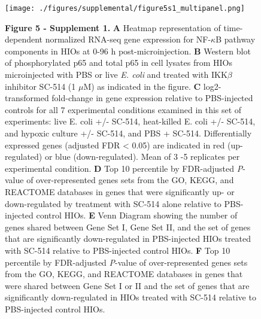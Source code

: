 \documentclass[9pt,lineo]{elife}
\date{\today}
\title{}
\begin{document}
\begin{figure}
\begin{fullwidth}
\centering\texttt{[image: ./figures/supplemental/figure5s1\_multipanel.png]}
 \caption*{\textbf{Figure 5 - Supplement 1. } \textbf{A} Heatmap representation of time-dependent normalized RNA-seq gene expression for NF-$\kappa$B pathway components in HIOs at 0-96 h post-microinjection. \textbf{B} Western blot of phosphorylated p65 and total p65 in cell lysates from HIOs microinjected with PBS or live \textit{E. coli} and treated with IKK$\beta$ inhibitor SC-514 (1 $\mu$M) as indicated in the figure. \textbf{C} log2-transformed fold-change in gene expression relative to PBS-injected controls for all 7 experimental conditions examined in this set of experiments: live E. coli +/- SC-514, heat-killed E. coli +/- SC-514, and hypoxic culture +/- SC-514, and PBS + SC-514. Differentially expressed genes (adjusted FDR < 0.05) are indicated in red (up-regulated) or blue (down-regulated). Mean of 3 -5 replicates per experimental condition. \textbf{D} Top 10 percentile by FDR-adjusted \textit{P}-value of over-represented genes sets from the GO, KEGG, and REACTOME databases in genes that were significantly up- or down-regulated by treatment with SC-514 alone relative to PBS-injected control HIOs. \textbf{E} Venn Diagram showing the number of genes shared between Gene Set I, Gene Set II, and the set of genes that are significantly down-regulated in PBS-injected HIOs treated with SC-514 relative to PBS-injected control HIOs. \textbf{F} Top 10 percentile by FDR-adjusted \textit{P}-value of  over-represented genes sets from the GO, KEGG, and REACTOME databases in genes that were shared between Gene Set I or II and the set of genes that are significantly down-regulated in HIOs treated with SC-514 relative to PBS-injected control HIOs.}
\label{fig:fullwidth}
\end{fullwidth}
\end{figure}
\end{document}
